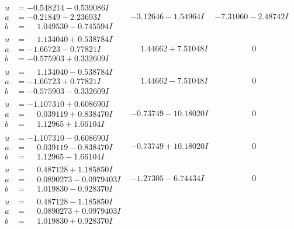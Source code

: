 \documentclass[1p]{elsarticle_modified}
\theoremstyle{definition}
\begin{document}
$$\begin{array}{c|c|c}
\begin{aligned}
u &= -0.548214 - 0.539086 I \\
a &= -0.21849 - 2.23693 I \\
b &= \phantom{-}1.049530 - 0.745594 I\end{aligned}
 & -3.12646 - 1.54964 I & -7.31060 - 2.48742 I \\ \hline\begin{aligned}
u &= \phantom{-}1.134040 + 0.538784 I \\
a &= -1.66723 - 0.77821 I \\
b &= -0.575903 + 0.332609 I\end{aligned}
 & \phantom{-}1.44662 + 7.51048 I & \phantom{-0.000000 } 0 \\ \hline\begin{aligned}
u &= \phantom{-}1.134040 - 0.538784 I \\
a &= -1.66723 + 0.77821 I \\
b &= -0.575903 - 0.332609 I\end{aligned}
 & \phantom{-}1.44662 - 7.51048 I & \phantom{-0.000000 } 0 \\ \hline\begin{aligned}
u &= -1.107310 + 0.608690 I \\
a &= \phantom{-}0.039119 + 0.838470 I \\
b &= \phantom{-}1.12965 + 1.66104 I\end{aligned}
 & -0.73749 - 10.18020 I & \phantom{-0.000000 } 0 \\ \hline\begin{aligned}
u &= -1.107310 - 0.608690 I \\
a &= \phantom{-}0.039119 - 0.838470 I \\
b &= \phantom{-}1.12965 - 1.66104 I\end{aligned}
 & -0.73749 + 10.18020 I & \phantom{-0.000000 } 0 \\ \hline\begin{aligned}
u &= \phantom{-}0.487128 + 1.185850 I \\
a &= \phantom{-}0.0890273 - 0.0979403 I \\
b &= \phantom{-}1.019830 - 0.928370 I\end{aligned}
 & -1.27305 - 6.74434 I & \phantom{-0.000000 } 0 \\ \hline\begin{aligned}
u &= \phantom{-}0.487128 - 1.185850 I \\
a &= \phantom{-}0.0890273 + 0.0979403 I \\
b &= \phantom{-}1.019830 + 0.928370 I\end{aligned}

\end{array}$$
\end{document}
